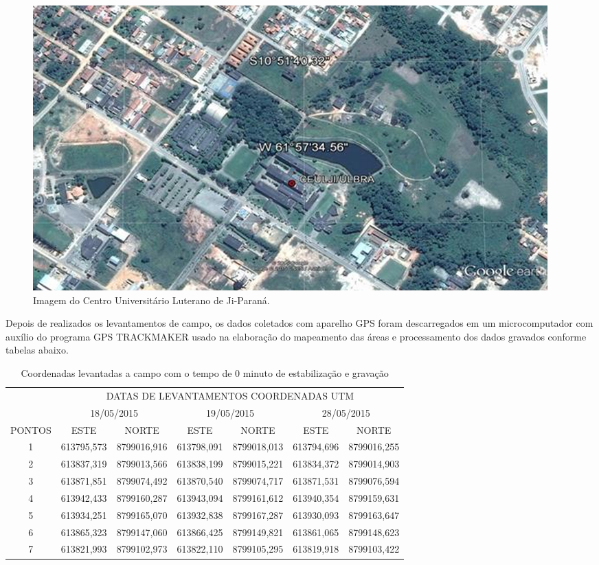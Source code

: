 \documentclass[article,12pt,onesidea,4paper,english,brazil]{abntex2}
\begin{document}
	\begin{figure}[h]
	\centering
	\includegraphics[width=0.7\linewidth]{pip05.png}
	\caption{Imagem do Centro Universitário Luterano de Ji-Paraná.}
\end{figure}

Depois de realizados os levantamentos de campo, os dados coletados com aparelho GPS foram descarregados em um microcomputador com auxílio do programa GPS TRACKMAKER usado na elaboração do mapeamento das áreas e processamento dos dados gravados conforme tabelas abaixo.

\begin{table}[h]
	\centering
	\caption{Coordenadas levantadas a campo com o tempo de 0 minuto de estabilização e gravação}
	\label{my-label}
	\begin{tabular}{c|c|c|c|c|c|c|}
		\cline{2-7}
		& \multicolumn{6}{c|}{DATAS DE LEVANTAMENTOS COORDENADAS UTM}                                         \\ \cline{2-7} 
		& \multicolumn{2}{c|}{18/05/2015} & \multicolumn{2}{c|}{19/05/2015} & \multicolumn{2}{c|}{28/05/2015} \\ \hline
		\multicolumn{1}{|c|}{PONTOS} & ESTE           & NORTE          & ESTE           & NORTE          & ESTE           & NORTE          \\ \hline
		\multicolumn{1}{|c|}{1}      & 613795,573     & 8799016,916    & 613798,091     & 8799018,013    & 613794,696     & 8799016,255    \\ \hline
		\multicolumn{1}{|c|}{2}      & 613837,319     & 8799013,566    & 613838,199     & 8799015,221    & 613834,372     & 8799014,903    \\ \hline
		\multicolumn{1}{|c|}{3}      & 613871,851     & 8799074,492    & 613870,540     & 8799074,717    & 613871,531     & 8799076,594    \\ \hline
		\multicolumn{1}{|c|}{4}      & 613942,433     & 8799160,287    & 613943,094     & 8799161,612    & 613940,354     & 8799159,631    \\ \hline
		\multicolumn{1}{|c|}{5}      & 613934,251     & 8799165,070    & 613932,838     & 8799167,287    & 613930,093     & 8799163,647    \\ \hline
		\multicolumn{1}{|c|}{6}      & 613865,323     & 8799147,060    & 613866,425     & 8799149,821    & 613861,065     & 8799148,623    \\ \hline
		\multicolumn{1}{|c|}{7}      & 613821,993     & 8799102,973    & 613822,110     & 8799105,295    & 613819,918     & 8799103,422    \\ \hline
	\end{tabular}
\end{table}
\end{document}
